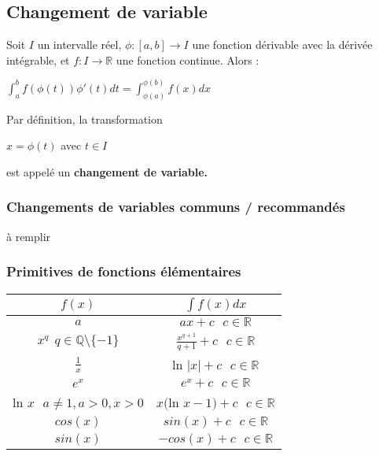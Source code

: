 \documentclass[12pt, a4paper]{book}
\begin{document}
\subsection{Changement de variable}
Soit $I$ un intervalle réel, $\phi : [a,b] \rightarrow I$ une fonction dérivable avec la dérivée intégrable, et $f: I \rightarrow \mathbb{R}$ une fonction continue. Alors :
\ \\
\begin{center}
    $\int_{a}^{b} f(\phi(t))\phi'(t)dt = \int_{\phi(a)}^{\phi(b)} f(x) dx$\\
\end{center}
Par définition, la transformation
\begin{center}
    $x = \phi(t) $ avec $ t\in I$
\end{center}
est appelé un \textbf{changement de variable.}
\subsubsection{Changements de variables communs / recommandés}
à remplir
\newpage
\subsubsection{Primitives de fonctions élémentaires}
\begin{center}
    \begin{tabular}{|c|c|}
        \hline
       $f(x)$ & $\int f(x)dx$\\
        \hline
        $a$ & $ax+c \ \ \ c \in \mathbb{R}$\\
        $x^q \ \ q \in \mathbb{Q} \setminus \{-1\}$ & $\frac{x^{q+1}}{q+1}+c \ \ \ c \in \mathbb{R}$\\
        $\frac{1}{x}$ & ln $\lvert x \rvert + c \ \ \ c \in \mathbb{R}$\\
        $e^x$ & $e^x + c \ \ \ c \in \mathbb{R}$\\
        ln $x \ \ \ a \not = 1, a>0, x>0$& $x($ln $x-1)+c \ \ \ c \in \mathbb{R}$\\
        $cos(x)$ & $sin(x)+c \ \ \ c \in \mathbb{R}$\\
        $sin(x)$ & $-cos(x)+c \ \ \ c \in \mathbb{R}$\\
        \hline
    \end{tabular}
\end{center}
\end{document}

